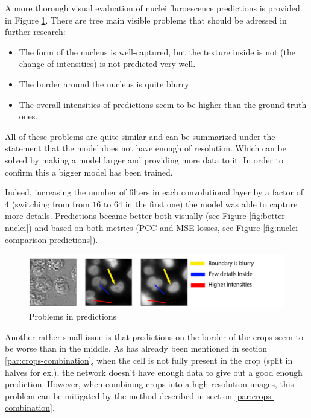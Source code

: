 A more thorough visual evaluation of nuclei fluroescence predictions is provided in Figure \ref{fig:nuclei-troubles}. There are tree main visible problems that should be adressed in further research:
\begin{itemize}
	\item The form of the nucleus is well-captured, but the texture inside is not (the change of intensities) is not predicted very well.
	\item The border around the nucleus is quite blurry
	\item The overall intensities of predictions seem to be higher than the ground truth ones.
\end{itemize}

All of these problems are quite similar and can be summarized under the statement that the model does not have enough of resolution. Which can be solved by making a model larger and providing more data to it. In order to confirm this a bigger model has been trained. 

Indeed, increasing the number of filters in each convolutional layer by a factor of $4$ (switching from from $16$ to $64$ in the first one) the model was able to capture more details. Predictions became better both visually (see Figure \ref{fig:better-nuclei}) and based on both metrics (PCC and MSE losses, see Figure \ref{fig:nuclei-comparison-predictions}).

\begin{figure}[H]
	\begin{center}
		\includegraphics[width=0.8\linewidth]{bilder/nuclei/problems.png}
		\caption{Problems in predictions}\label{fig:nuclei-troubles}
	\end{center}
\end{figure}

Another rather small issue is that predictions on the border of the crops seem to be worse than in the middle. As has already been mentioned in section \ref{par:crops-combination}, when the cell is not fully present in the crop (split in halves for ex.), the network doesn't have enough data to give out a good enough prediction. However, when combining crops into a high-resolution images, this problem can be mitigated by the method described in section \ref{par:crops-combination}.

